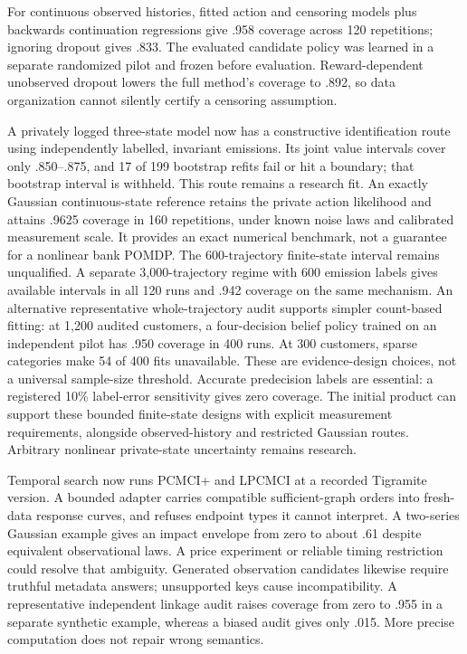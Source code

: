 \documentclass[11pt,a4paper,openany]{book}
\begin{document}
For continuous observed histories, fitted action and censoring models plus
backwards continuation regressions give .958 coverage across 120
repetitions; ignoring dropout gives .833. The evaluated candidate policy
was learned in a separate randomized pilot and frozen before evaluation.
Reward-dependent unobserved dropout lowers the full method's coverage to
.892, so data organization cannot silently certify a censoring assumption.

A privately logged three-state model now has a constructive identification
route using independently labelled, invariant emissions. Its joint value
intervals cover only .850--.875, and 17 of 199 bootstrap refits fail or hit
a boundary; that bootstrap interval is withheld. This route remains a
research fit. An exactly Gaussian continuous-state reference retains the
private action likelihood and attains .9625 coverage in 160 repetitions,
under known noise laws and calibrated measurement scale. It provides an
exact numerical benchmark, not a guarantee for a nonlinear bank POMDP.
The 600-trajectory finite-state interval remains unqualified. A separate
3,000-trajectory regime with 600 emission labels gives available intervals
in all 120 runs and .942 coverage on the same mechanism. An alternative
representative whole-trajectory audit supports simpler count-based fitting:
at 1,200 audited customers, a four-decision belief policy trained on an
independent pilot has .950 coverage in 400 runs. At 300 customers, sparse
categories make 54 of 400 fits unavailable. These are evidence-design
choices, not a universal sample-size threshold. Accurate predecision labels
are essential: a registered 10\% label-error sensitivity gives zero coverage.
The initial product can support these bounded finite-state designs with
explicit measurement requirements, alongside observed-history and restricted
Gaussian routes. Arbitrary nonlinear private-state uncertainty remains research.

Temporal search now runs PCMCI+ and LPCMCI at a recorded Tigramite version.
A bounded adapter carries compatible sufficient-graph orders into fresh-data
response curves, and refuses endpoint types it cannot interpret. A two-series
Gaussian example gives an impact envelope from zero to about .61 despite
equivalent observational laws. A price experiment or reliable timing
restriction could resolve that ambiguity. Generated observation candidates
likewise require truthful metadata answers; unsupported keys cause
incompatibility. A representative independent linkage audit raises coverage
from zero to .955 in a separate synthetic example, whereas a biased audit
gives only .015. More precise computation does not repair wrong semantics.
\end{document}
